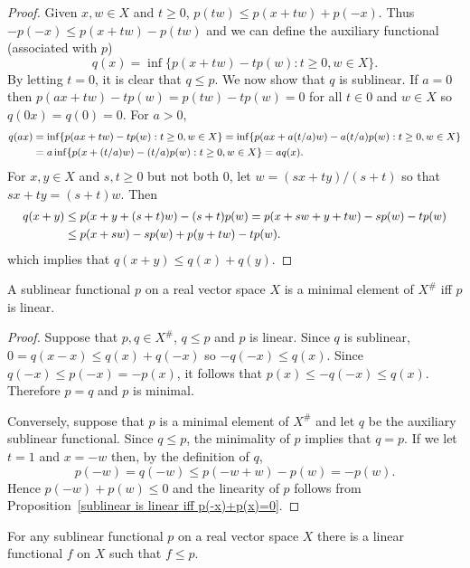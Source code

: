 \begin{proof}
Given $x,w\in X$ and $t\geq 0$, $p(tw)\leq p(x+tw)+p(-x)$. Thus $-p(-x)\leq p(x+tw)-p(tw)$ and we can define the auxiliary functional (associated with $p$)
\[q(x)=\inf\{p(x+tw)-tp(w):t\geq 0,w\in X\}.\]
By letting $t=0$, it is clear that $q\leq p$. We now show that $q$ is sublinear. If $a=0$ then $p(ax+tw)-tp(w)=p(tw)-tp(w)=0$ for all $t\in 0$ and $w\in X$ so $q(0x)=q(0)=0$. For $a>0$,
\begin{equation*}\small
\begin{aligned}
q(ax)&=\inf\{p(ax+tw)-tp(w):t\geq 0,w\in X\}=\inf\{p(ax+a(t/a)w)-a(t/a)p(w):t\geq 0,w\in X\}\\
&=a\inf\{p(x+(t/a)w)-(t/a)p(w):t\geq 0,w\in X\}=aq(x).
\end{aligned}
\end{equation*}
For $x,y\in X$ and $s,t\geq 0$ but not both $0$, let $w=(sx+ty)/(s+t)$ so that $sx+ty=(s+t)w$. Then
\begin{equation*}\small
\begin{aligned}
q(x+y)&\leq p(x+y+(s+t)w)-(s+t)p(w)=p(x+sw+y+tw)-sp(w)-tp(w)\\
&\leq p(x+sw)-sp(w)+p(y+tw)-tp(w).
\end{aligned}
\end{equation*}
which implies that $q(x+y)\leq q(x)+q(y)$.
\end{proof}
\begin{proposition}\label{sublinear is linear iff minimal}
A sublinear functional $p$ on a real vector space $X$ is a minimal element of $X^{\#}$ iff $p$ is linear.
\end{proposition}
\begin{proof}
Suppose that $p,q\in X^{\#}$, $q\leq p$ and $p$ is linear. Since $q$ is sublinear, $0=q(x-x)\leq q(x)+q(-x)$ so $-q(-x)\leq q(x)$. Since $q(-x)\leq p(-x)=-p(x)$, it follows that $p(x)\leq -q(-x)\leq q(x)$. Therefore $p=q$ and $p$ is minimal.\par
Conversely, suppose that $p$ is a minimal element of $X^{\#}$ and let $q$ be the auxiliary sublinear functional. Since $q\leq p$, the minimality of $p$ implies that $q=p$. If we let $t=1$ and $x=-w$ then, by the definition of $q$,
\[p(-w)=q(-w)\leq p(-w+w)-p(w)= -p(w).\]
Hence $p(-w)+p(w)\leq 0$ and the linearity of $p$ follows from Proposition~\ref{sublinear is linear iff p(-x)+p(x)=0}.
\end{proof}
\begin{corollary}\label{sublinear functional linear beneath}
For any sublinear functional $p$ on a real vector space $X$ there is a linear functional $f$ on $X$ such that $f\leq p$.
\end{corollary}
